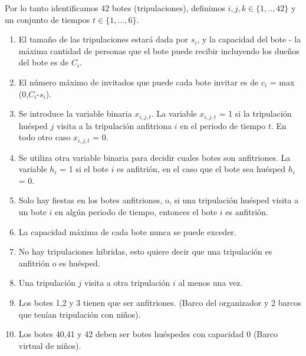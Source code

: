 \documentclass[spanish, fleqn]{article}
\begin{document}
\newpage

Por lo tanto identificamos 42 botes (tripulaciones), definimos $\mathit{i},\mathit{j},\mathit{k} \in \{1,..,42\}$ y un conjunto de tiempos $\mathit{t} \in \{1,...,6\}$.

\begin{enumerate}
\item El tamaño de las tripulaciones estará dada por $\mathit{s}_{\mathit{i}}$, y la capacidad del bote - la máxima cantidad de personas que el bote puede recibir incluyendo los dueños del bote es de $\mathit{C}_{\mathit{i}}$.

\item El número máximo de invitados que puede cada bote invitar es de $\mathit{c}_{\mathit{i}}$ = max (0,$\mathit{C}_{\mathit{i}}$-$\mathit{s}_{\mathit{i}}$).

\item Se introduce la variable binaria $\mathit{x}_{\mathit{i},\mathit{j},\mathit{t}}$. La variable $\mathit{x}_{\mathit{i},\mathit{j},\mathit{t}}$ = 1 si la tripulación huésped $\mathit{j}$ visita a la tripulación anfitriona $\mathit{i}$ en el periodo de tiempo $\mathit{t}$. En todo otro caso $\mathit{x}_{\mathit{i},\mathit{j},\mathit{t}}$ = 0.

\item Se utiliza otra variable binaria para decidir cuales botes son anfitriones. La variable $\mathit{h}_{\mathit{i}}$ = 1 si el bote $\mathit{i}$ es anfitrión, en el caso que el bote sea huésped $\mathit{h}_{\mathit{i}}$ = 0.

\item Solo hay fiestas en los botes anfitriones, o, si una tripulación huésped visita a un bote $\mathit{i}$ en algún periodo de tiempo, entonces el bote $\mathit{i}$ es anfitrión.

\item La capacidad máxima de cada bote nunca se puede exceder.

\item No hay tripulaciones hibridas, esto quiere decir que una tripulación es anfitrión o es huésped.

\item Una tripulación $\mathit{j}$ visita a otra tripulación $\mathit{i}$ al menos una vez.

\item Los botes 1,2 y 3 tienen que ser anfitriones. (Barco del organizador y 2 barcos que tenían tripulación con niños).

\item Los botes 40,41 y 42 deben ser botes huéspedes con capacidad 0 (Barco virtual de niños).


\end{enumerate}
\end{document}
